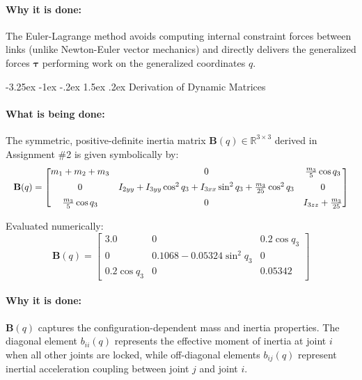 \documentclass[11pt, a4paper]{article}
\makeatletter
\renewcommand{\subsection}{\@startsection{subsection}{2}{\z@}%
    {-3.25ex \@plus -1ex \@minus -.2ex}%
    {1.5ex \@plus .2ex}%
    {\normalfont\large\bfseries\color{brandaccent}}}
\makeatother
\begin{document}
\paragraph{Why it is done:}
The Euler-Lagrange method avoids computing internal constraint forces between links (unlike Newton-Euler vector mechanics) and directly delivers the generalized forces $\boldsymbol{\tau}$ performing work on the generalized coordinates $q$.

\subsection{Derivation of Dynamic Matrices}
\paragraph{What is being done:}
The symmetric, positive-definite inertia matrix $\mathbf{B}(q) \in \mathbb{R}^{3 \times 3}$ derived in Assignment \#2 is given symbolically by:
\begin{equation}
\resizebox{\linewidth}{!}{$
\mathbf{B}(q) = \begin{bmatrix}
m_1 + m_2 + m_3 & 0 & \frac{m_3}{5}\cos q_3 \\[0.5em]
0 & I_{2yy} + I_{3yy}\cos^2 q_3 + I_{3xx}\sin^2 q_3 + \frac{m_3}{25}\cos^2 q_3 & 0 \\[0.5em]
\frac{m_3}{5}\cos q_3 & 0 & I_{3zz} + \frac{m_3}{25}
\end{bmatrix}
$}
\end{equation}

Evaluated numerically:
\begin{equation}
\mathbf{B}(q) = \begin{bmatrix}
3.0 & 0 & 0.2\cos q_3 \\
0 & 0.1068 - 0.05324\sin^2 q_3 & 0 \\
0.2\cos q_3 & 0 & 0.05342
\end{bmatrix}
\end{equation}

\paragraph{Why it is done:}
$\mathbf{B}(q)$ captures the configuration-dependent mass and inertia properties. The diagonal element $b_{ii}(q)$ represents the effective moment of inertia at joint $i$ when all other joints are locked, while off-diagonal elements $b_{ij}(q)$ represent inertial acceleration coupling between joint $j$ and joint $i$.
\end{document}

